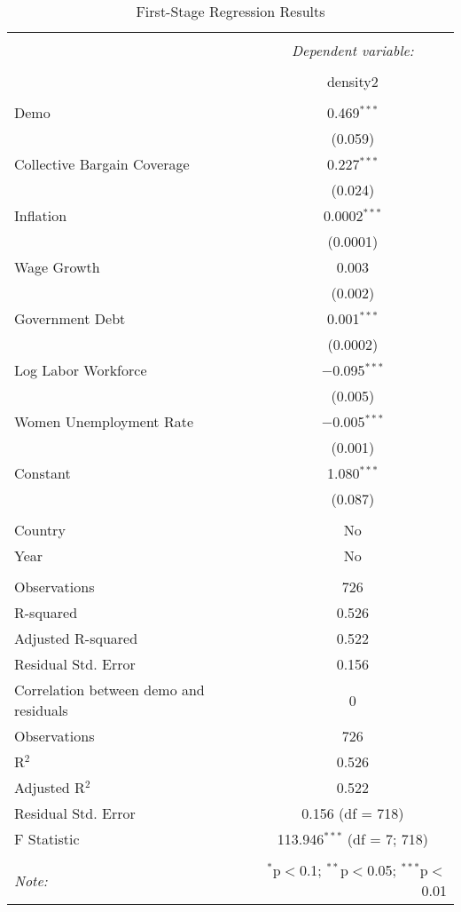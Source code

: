 
\begin{table}[!htbp] \centering 
  \caption{First-Stage Regression Results} 
  \label{} 
\begin{tabular}{@{\extracolsep{5pt}}lc} 
\\[-1.8ex]\hline 
\hline \\[-1.8ex] 
 & \multicolumn{1}{c}{\textit{Dependent variable:}} \\ 
\cline{2-2} 
\\[-1.8ex] & density2 \\ 
\hline \\[-1.8ex] 
 Demo & 0.469$^{***}$ \\ 
  & (0.059) \\ 
  Collective Bargain Coverage & 0.227$^{***}$ \\ 
  & (0.024) \\ 
  Inflation & 0.0002$^{***}$ \\ 
  & (0.0001) \\ 
  Wage Growth & 0.003 \\ 
  & (0.002) \\ 
  Government Debt & 0.001$^{***}$ \\ 
  & (0.0002) \\ 
  Log Labor Workforce & $-$0.095$^{***}$ \\ 
  & (0.005) \\ 
  Women Unemployment Rate & $-$0.005$^{***}$ \\ 
  & (0.001) \\ 
  Constant & 1.080$^{***}$ \\ 
  & (0.087) \\ 
 \hline \\[-1.8ex] 
Country & No \\ 
Year & No \\ 
\hline \\[-1.8ex] 
Observations & 726 \\ 
R-squared & 0.526 \\ 
Adjusted R-squared & 0.522 \\ 
Residual Std. Error & 0.156 \\ 
Correlation between demo and residuals & 0 \\ 
Observations & 726 \\ 
R$^{2}$ & 0.526 \\ 
Adjusted R$^{2}$ & 0.522 \\ 
Residual Std. Error & 0.156 (df = 718) \\ 
F Statistic & 113.946$^{***}$ (df = 7; 718) \\ 
\hline 
\hline \\[-1.8ex] 
\textit{Note:}  & \multicolumn{1}{r}{$^{*}$p$<$0.1; $^{**}$p$<$0.05; $^{***}$p$<$0.01} \\ 
\end{tabular} 
\end{table} 
